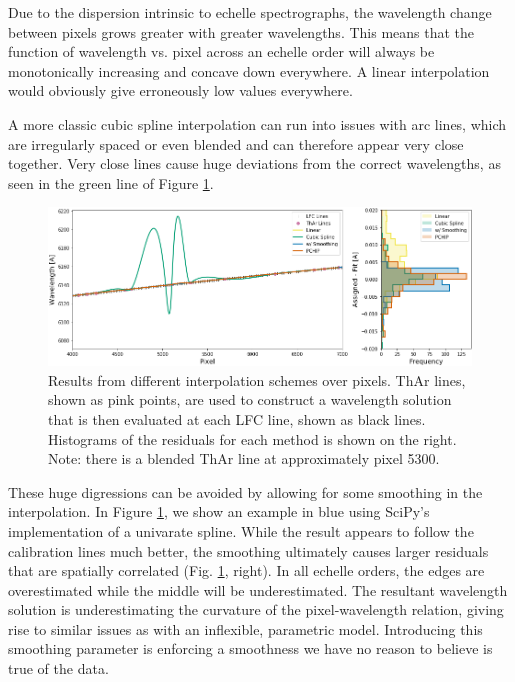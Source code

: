 \documentclass[twocolumn]{aastex63}
\begin{document}
Due to the dispersion intrinsic to echelle spectrographs, the wavelength change between pixels grows greater with greater wavelengths.  This means that the function of wavelength vs. pixel across an echelle order will always be monotonically increasing and concave down everywhere.  A linear interpolation would obviously give erroneously low values everywhere.

A more classic cubic spline interpolation can run into issues with arc lines, which are irregularly spaced or even blended and can therefore appear very close together.  Very close lines cause huge deviations from the correct wavelengths, as seen in the green line of Figure \ref{fig:xinterp}.

\begin{figure}[h]
\centering
\includegraphics[width=\textwidth]{Figures/intpx_tests.png}
\caption{Results from different interpolation schemes over pixels.  ThAr lines, shown as pink points, are used to construct a wavelength solution that is then evaluated at each LFC line, shown as black lines.  Histograms of the residuals for each method is shown on the right.  Note: there is a blended ThAr line at approximately pixel 5300.}
\label{fig:xinterp}
\end{figure} 

These huge digressions can be avoided by allowing for some smoothing in the interpolation.  In Figure \ref{fig:xinterp}, we show an example in blue using SciPy's implementation of a univarate spline.  While the result appears to follow the calibration lines much better, the smoothing ultimately causes larger residuals that are spatially correlated (Fig. \ref{fig:xinterp}, right).  In all echelle orders, the edges are overestimated while the middle will be underestimated.  The resultant wavelength solution is underestimating the curvature of the pixel-wavelength relation, giving rise to similar issues as with an inflexible, parametric model.  Introducing this smoothing parameter is enforcing a smoothness we have no reason to believe is true of the data.
\end{document}
